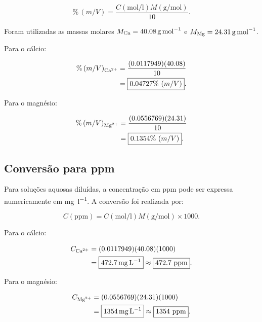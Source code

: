 \documentclass[a4paper,12pt]{article}
\begin{document}
\begin{equation}
\%\,(m/V)=\frac{C\left(\si{\mole\per\litre}\right)
M\left(\si{\gram\per\mole}\right)}{10}.
\end{equation}

Foram utilizadas as massas molares
$M_{\ce{Ca}}=\qty{40.08}{\gram\per\mole}$ e
$M_{\ce{Mg}}=\qty{24.31}{\gram\per\mole}$.

Para o cálcio:

\begin{align}
\%\,(m/V)_{\ce{Ca^2+}}
&=
\frac{(0.0117949)(40.08)}{10}\\
&=
\boxed{0.04727\%\ (m/V)}.
\end{align}

Para o magnésio:

\begin{align}
\%\,(m/V)_{\ce{Mg^2+}}
&=
\frac{(0.0556769)(24.31)}{10}\\
&=
\boxed{0.1354\%\ (m/V)}.
\end{align}

\subsection{Conversão para ppm}

Para soluções aquosas diluídas, a concentração em ppm pode ser expressa
numericamente em \si{\milli\gram\per\litre}. A conversão foi realizada por:

\begin{equation}
C(\mathrm{ppm})=
C\left(\si{\mole\per\litre}\right)
M\left(\si{\gram\per\mole}\right)
\times 1000.
\end{equation}

Para o cálcio:

\begin{align}
C_{\ce{Ca^2+}}
&=
(0.0117949)(40.08)(1000)\\
&=
\boxed{\qty{472.7}{\milli\gram\per\litre}}
\approx
\boxed{472.7\ \mathrm{ppm}}.
\end{align}

Para o magnésio:

\begin{align}
C_{\ce{Mg^2+}}
&=
(0.0556769)(24.31)(1000)\\
&=
\boxed{\qty{1354}{\milli\gram\per\litre}}
\approx
\boxed{1354\ \mathrm{ppm}}.
\end{align}

\end{document}

